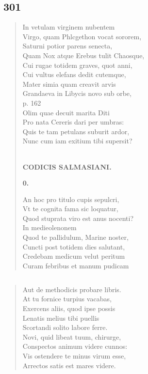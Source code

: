 \documentclass[11pt, a4paper]{report}
\begin{document}
            \subsection*{301}
      \begin{verse}
      In vetulam virginem nubentem \\ Virgo, quam Phlcgethon vocat sororem, \\ Saturni potior parens senecta, \\ Quam Nox atque Erebus tulit Chaosque, \\ Cui rugae totidem graves, quot anni, \\ Cui vultus elefans dedit cutemque, \\ Mater simia quam creavit arvis \\ Grandaeva in Libycis novo sub orbe, \\ p. 162 \\ Olim quae decuit marita Diti \\ Pro nata Cereris dari per umbras: \\ Quis te tam petulans suburit ardor, \\ Nunc cum iam exitium tibi supersit? \\ 
        ﻿\pagebreak 
    \begin{center} \textbf{CODICIS SALMASIANI.} \end{center} \marginpar{[255]} \begin{center} \textbf{0.} \end{center}An hoc pro titulo cupis sepulcri, \\ Vt te cognita fama sic loquatur, \\ Quod stuprata viro est anus nocenti? \\ In medieolenonem \\ Quod te pallidulum, Marine noster, \\ Cuncti post totidem dies salutant, \\ Credebam medicum velut peritum \\ Curam febribus et manum pudicam \\ 
      \end{verse}
  
            \subsection*{}
      \begin{verse}
      Aut de methodicis probare libris. \\ At tu fornice turpius vacabas, \\ Exercens aliis, quod ipse possis \\ Lenatis melius tibi puellis \\ Scortandi solito labore ferre. \\ Novi, quid libeat tuum, chirurge, \\ Conspectos animum videre cunnos: \\ Vis ostendere te minus virum esse, \\ Arrectos satis est mares videre. \\ 
      \end{verse}
  
\end{document}
